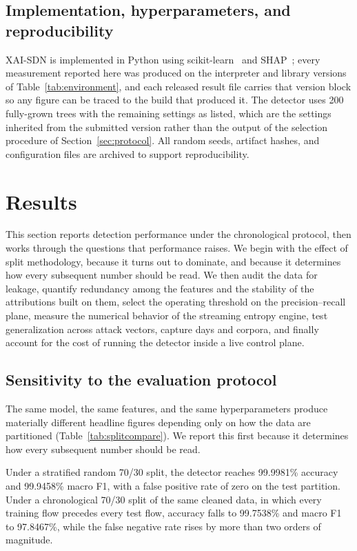 \documentclass{ieeeaccess}
\begin{document}
\subsection{Implementation, hyperparameters, and reproducibility}
XAI-SDN is implemented in Python using scikit-learn~\cite{pedregosa2011sklearn} and SHAP~\cite{lundberg2017shap}; every measurement reported here was produced on the interpreter and library versions of Table~\ref{tab:environment}, and each released result file carries that version block so any figure can be traced to the build that produced it. The detector uses 200 fully-grown trees with the remaining settings as listed, which are the settings inherited from the submitted version rather than the output of the selection procedure of Section~\ref{sec:protocol}. All random seeds, artifact hashes, and configuration files are archived to support reproducibility.



\section{Results}
\label{sec:results}

This section reports detection performance under the chronological protocol, then works through the questions that performance raises. We begin with the effect of split methodology, because it turns out to dominate, and because it determines how every subsequent number should be read. We then audit the data for leakage, quantify redundancy among the features and the stability of the attributions built on them, select the operating threshold on the precision--recall plane, measure the numerical behavior of the streaming entropy engine, test generalization across attack vectors, capture days and corpora, and finally account for the cost of running the detector inside a live control plane.

\subsection{Sensitivity to the evaluation protocol}
\label{sec:splitresult}
The same model, the same features, and the same hyperparameters produce materially different headline figures depending only on how the data are partitioned (Table~\ref{tab:splitcompare}). We report this first because it determines how every subsequent number should be read.

Under a stratified random 70/30 split, the detector reaches 99.9981\% accuracy and 99.9458\% macro F1, with a false positive rate of zero on the test partition. Under a chronological 70/30 split of the same cleaned data, in which every training flow precedes every test flow, accuracy falls to 99.7538\% and macro F1 to 97.8467\%, while the false negative rate rises by more than two orders of magnitude.
\end{document}
